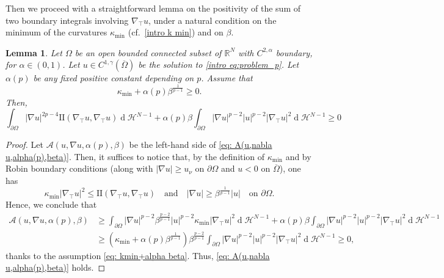 \documentclass[10pt,a4paper]{amsart}
\numberwithin{equation}{section}
\newcommand{\R}{\mathbb{R}}
\newtheorem{lemma}[teo]{Lemma}
\renewcommand{\d}[1]{\ensuremath{\operatorname{d}\!{#1}}}
\begin{document}
    Then we proceed with a straightforward lemma on the positivity of the sum of two boundary integrals involving $\nabla_\top u$, under a natural condition on the minimum of the curvatures $\kappa_{\min}$ (cf.\, \eqref{intro k min}) and on $\beta$.
    \begin{lemma}\label{lemma positivity int II + int alpha(p)}
        Let $\Omega$ be an open bounded connected subset of $\R^N$ with $C^{2,\alpha}$ boundary, for $\alpha \in (0,1)$. Let $u \in C^{1,\gamma}(\overline{\Omega})$ be the solution to \eqref{intro eq:problem_p}. Let $\alpha(p)$ be any fixed positive constant depending on $p$. Assume that
        \begin{equation}\label{eq: kmin+alpha beta}
            \kappa_{\min} + \alpha(p) \beta^{\frac{1}{p-1}} \geq 0.
        \end{equation}
        Then,
        \begin{equation}\label{eq: A(u,nabla u,alpha(p),beta)}
            \int_{\partial\Omega} |\nabla u|^{2p-4} \mathrm{I\!I}(\nabla_\top u,\nabla_\top u) \d{}\mathcal{H}^{N-1} + \alpha(p) \beta \int_{\partial\Omega} |\nabla u|^{p-2}|u|^{p-2}|\nabla_\top u|^2 \d{}\mathcal{H}^{N-1} \geq 0
        \end{equation}
    \end{lemma}

    \begin{proof}
    Let $ \mathcal{A}(u,\nabla u, \alpha(p),\beta)$ be the left-hand side of \eqref{eq: A(u,nabla u,alpha(p),beta)}. Then, it suffices to notice that, by the definition of $\kappa_{\min}$ and by Robin boundary conditions (along with $|\nabla u|\geq u_\nu$ on $\partial\Omega$ and $u < 0$ on $\overline{\Omega}$), one has
    \begin{equation*}
        \kappa_{\min} |\nabla_\top u|^2 \leq \mathrm{I\!I}(\nabla_\top u,\nabla_\top u) \quad \text{and} \quad |\nabla u| \geq \beta^{\frac{1}{p-1}} |u| \quad \text{on } \partial\Omega.
    \end{equation*}
    Hence, we conclude that 
    \begin{equation*}
    \begin{split}
        \mathcal{A}(u,\nabla u, \alpha(p),\beta) &\geq \int_{\partial\Omega} |\nabla u|^{p-2} \beta^{\frac{p-2}{p-1}} |u|^{p-2} \kappa_{\min} |\nabla_\top u|^2  \d{}\mathcal{H}^{N-1} + \alpha(p)\beta \int_{\partial\Omega} |\nabla u|^{p-2}|u|^{p-2}|\nabla_\top u|^2 \d{}\mathcal{H}^{N-1}
        \\
        &\geq \left( \kappa_{\min} + \alpha(p) \beta^{\frac{1}{p-1}} \right) \beta^{\frac{p-2}{p-1}} \int_{\partial\Omega} |\nabla u|^{p-2}|u|^{p-2}|\nabla_\top u|^2
        \d{}\mathcal{H}^{N-1} \geq 0,
    \end{split}
    \end{equation*}
    thanks to the assumption \eqref{eq: kmin+alpha beta}. Thus, \eqref{eq: A(u,nabla u,alpha(p),beta)} holds.
    \end{proof}
\end{document}
